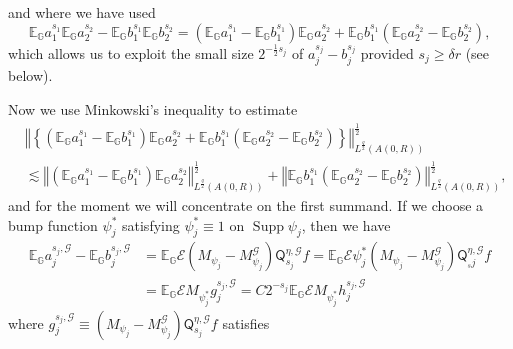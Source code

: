 \documentclass{amsart}%
\theoremstyle{plain}
\numberwithin{equation}{section}
\begin{document}
and where we have used%
\[
\mathbb{E}_{\mathbb{G}}a_{1}^{s_{1}}\mathbb{E}_{\mathbb{G}}a_{2}^{s_{2}%
}-\mathbb{E}_{\mathbb{G}}b_{1}^{s_{1}}\mathbb{E}_{\mathbb{G}}b_{2}^{s_{2}%
}=\left(  \mathbb{E}_{\mathbb{G}}a_{1}^{s_{1}}-\mathbb{E}_{\mathbb{G}}%
b_{1}^{s_{1}}\right)  \mathbb{E}_{\mathbb{G}}a_{2}^{s_{2}}+\mathbb{E}%
_{\mathbb{G}}b_{1}^{s_{1}}\left(  \mathbb{E}_{\mathbb{G}}a_{2}^{s_{2}%
}-\mathbb{E}_{\mathbb{G}}b_{2}^{s_{2}}\right)  ,
\]
which allows us to exploit the small size $2^{-\frac{1}{2}s_{j}}$ of
$a_{j}^{s_{j}}-b_{j}^{s_{j}}$ provided $s_{j}\geq\delta r$ (see below).

Now we use Minkowski's inequality to estimate%
\begin{align}
& \left\Vert \left\{  \left(  \mathbb{E}_{\mathbb{G}}a_{1}^{s_{1}}%
-\mathbb{E}_{\mathbb{G}}b_{1}^{s_{1}}\right)  \mathbb{E}_{\mathbb{G}}%
a_{2}^{s_{2}}+\mathbb{E}_{\mathbb{G}}b_{1}^{s_{1}}\left(  \mathbb{E}%
_{\mathbb{G}}a_{2}^{s_{2}}-\mathbb{E}_{\mathbb{G}}b_{2}^{s_{2}}\right)
\right\}  \right\Vert _{L^{\frac{q}{2}}\left(  A\left(  0,R\right)  \right)
}^{\frac{1}{2}}\label{summands}\\
& \lesssim\left\Vert \left(  \mathbb{E}_{\mathbb{G}}a_{1}^{s_{1}}%
-\mathbb{E}_{\mathbb{G}}b_{1}^{s_{1}}\right)  \mathbb{E}_{\mathbb{G}}%
a_{2}^{s_{2}}\right\Vert _{L^{\frac{q}{2}}\left(  A\left(  0,R\right)
\right)  }^{\frac{1}{2}}+\left\Vert \mathbb{E}_{\mathbb{G}}b_{1}^{s_{1}%
}\left(  \mathbb{E}_{\mathbb{G}}a_{2}^{s_{2}}-\mathbb{E}_{\mathbb{G}}%
b_{2}^{s_{2}}\right)  \right\Vert _{L^{\frac{q}{2}}\left(  A\left(
0,R\right)  \right)  }^{\frac{1}{2}},\nonumber
\end{align}
and for the moment we will concentrate on the first summand. If we choose a
bump function $\psi_{j}^{\ast}$ satisfying $\psi_{j}^{\ast}\equiv1$ on
$\operatorname*{Supp}\psi_{j}$, then we have%
\begin{align*}
\mathbb{E}_{\mathbb{G}}a_{j}^{s_{j},\mathcal{G}}-\mathbb{E}_{\mathbb{G}}%
b_{j}^{s_{j},\mathcal{G}}  & =\mathbb{E}_{\mathbb{G}}\mathcal{E}\left(
M_{\psi_{j}}-M_{\psi_{j}}^{\mathcal{G}}\right)  \mathsf{Q}_{s_{j}}%
^{\eta,\mathcal{G}}f=\mathbb{E}_{\mathbb{G}}\mathcal{E}\psi_{j}^{\ast}\left(
M_{\psi_{j}}-M_{\psi_{j}}^{\mathcal{G}}\right)  \mathsf{Q}_{_{s}j}%
^{\eta,\mathcal{G}}f\\
& =\mathbb{E}_{\mathbb{G}}\mathcal{E}M_{\psi_{j}^{\ast}}g_{j}^{s_{j}%
,\mathcal{G}}=C2^{-s_{j}}\mathbb{E}_{\mathbb{G}}\mathcal{E}M_{\psi_{j}^{\ast}%
}h_{j}^{s_{j},\mathcal{G}}%
\end{align*}
where $g_{j}^{s_{j},\mathcal{G}}\equiv\left(  M_{\psi_{j}}-M_{\psi_{j}%
}^{\mathcal{G}}\right)  \mathsf{Q}_{s_{j}}^{\eta,\mathcal{G}}f$ satisfies
\end{document}
